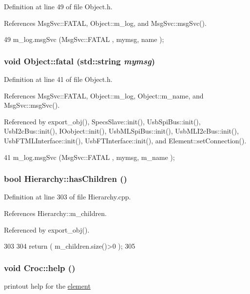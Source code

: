 Definition at line 49 of file Object.h.

References MsgSvc::FATAL, Object::m\_\-log, and MsgSvc::msgSvc().


\begin{DoxyCode}
49 { m_log.msgSvc (MsgSvc::FATAL   , mymsg, name ); }
\end{DoxyCode}
\hypertarget{classObject_aad5a16aac7516ce65bd5ec02ab07fc80}{
\subsubsection[{fatal}]{\setlength{\rightskip}{0pt plus 5cm}void Object::fatal (std::string {\em mymsg})}}
\label{classObject_aad5a16aac7516ce65bd5ec02ab07fc80}


Definition at line 41 of file Object.h.

References MsgSvc::FATAL, Object::m\_\-log, Object::m\_\-name, and MsgSvc::msgSvc().

Referenced by export\_\-obj(), SpecsSlave::init(), UsbSpiBus::init(), UsbI2cBus::init(), IOobject::init(), UsbMLSpiBus::init(), UsbMLI2cBus::init(), UsbFTMLInterface::init(), UsbFTInterface::init(), and Element::setConnection().


\begin{DoxyCode}
41 { m_log.msgSvc (MsgSvc::FATAL   , mymsg, m_name ); }
\end{DoxyCode}
\hypertarget{classHierarchy_a255174fe4d316d2a3f430dcb9dab29f1}{
\subsubsection[{hasChildren}]{\setlength{\rightskip}{0pt plus 5cm}bool Hierarchy::hasChildren ()}}
\label{classHierarchy_a255174fe4d316d2a3f430dcb9dab29f1}


Definition at line 303 of file Hierarchy.cpp.

References Hierarchy::m\_\-children.

Referenced by export\_\-obj().


\begin{DoxyCode}
303                               {
304   return ( m_children.size()>0 );
305 }
\end{DoxyCode}
\hypertarget{classCroc_a21195cea3b5ba13f90397cc8faa52633}{
\subsubsection[{help}]{\setlength{\rightskip}{0pt plus 5cm}void Croc::help ()}}
\label{classCroc_a21195cea3b5ba13f90397cc8faa52633}
printout help for the \hyperlink{namespaceelement}{element} 

